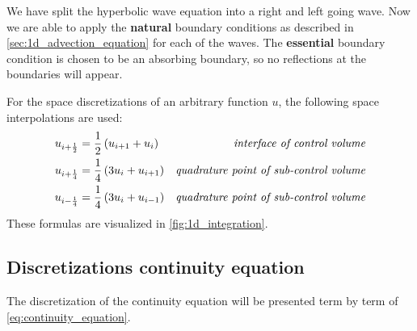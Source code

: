 We have split the hyperbolic wave equation into a right and left going wave.
Now we are able to apply the \textbf{natural} boundary conditions as described in \autoref{sec:1d_advection_equation} for each of the waves.
The \textbf{essential} boundary condition is chosen to be an absorbing boundary, so no reflections at the boundaries will appear.

For the space discretizations of an arbitrary function $u$, the following space interpolations are used:
\begin{align}
    u_{i+\frac{1}{2}} & = \frac{1}{2} \left( u_{i+1} + u_{i} \right) &\textit{interface of control volume}
    \\
    u_{i+\frac{1}{4}} & = \frac{1}{4} \left( 3 u_{i} + u_{i+1} \right) &\textit{quadrature point of sub-control volume}
    \\
    u_{i-\frac{1}{4}} & = \frac{1}{4} \left( 3 u_{i} + u_{i-1} \right) &\textit{quadrature point of sub-control volume}
\end{align}
These formulas are visualized in \autoref{fig:1d_integration}.


\subsection{Discretizations continuity equation}
The discretization of the continuity equation will be presented term by term of \autoref{eq:continuity_equation}.
